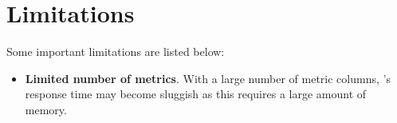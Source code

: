 
\section{Limitations}

Some important \hpcviewer{} limitations are listed below:
\begin{itemize}

\item \textbf{Limited number of metrics}.
  With a large number of metric columns, \hpcviewer{}'s response time may become sluggish as this requires a large amount of memory.


\end{itemize}
